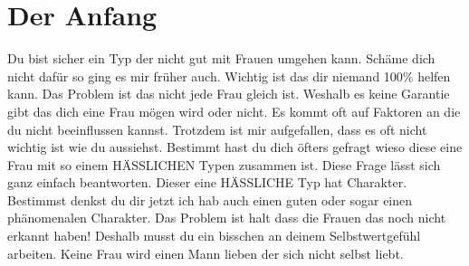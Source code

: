 \chapter{Der Anfang}

Du bist sicher ein Typ der nicht gut mit Frauen umgehen kann. Schäme dich nicht dafür so ging es mir früher auch. Wichtig ist das dir niemand 100\% helfen kann. Das Problem ist das nicht jede Frau gleich ist. Weshalb es keine Garantie gibt das dich eine Frau mögen wird oder nicht. Es kommt oft auf Faktoren an die du nicht beeinflussen kannst. Trotzdem ist mir aufgefallen, dass es oft nicht wichtig ist wie du aussiehst. Bestimmt hast du dich öfters gefragt wieso diese eine Frau mit so einem HÄSSLICHEN Typen zusammen ist. Diese Frage lässt sich ganz einfach beantworten. Dieser eine HÄSSLICHE Typ hat Charakter. Bestimmst denkst du dir jetzt ich hab auch einen guten oder sogar einen phänomenalen Charakter. Das Problem ist halt dass die Frauen das noch nicht erkannt haben! Deshalb musst du ein bisschen an deinem Selbstwertgefühl arbeiten. Keine Frau wird einen Mann lieben der sich nicht selbst liebt. 

